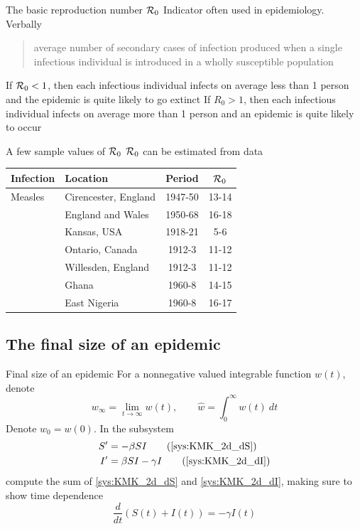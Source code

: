 \documentclass[aspectratio=43]{beamer}
\begin{document}
\begin{frame}{The basic reproduction number $\mathcal{R}_0$}
\bbullet Indicator often used in epidemiology. Verbally
\begin{quote}
  average number of secondary cases of infection produced when a single infectious individual is introduced in a wholly susceptible population
\end{quote}
\vfill
\bbullet If $\mathcal{R}_0<1$, then each infectious individual infects on average less than 1 person and the epidemic is quite likely to go extinct 
\vfill
\bbullet If $R_0>1$, then each infectious individual infects on average more than 1 person and an epidemic is quite likely to occur
\end{frame}

\begin{frame}{A few sample values of $\mathcal{R}_0$}
  $\mathcal{R}_0$ can be estimated from data
  \vfill
  \begin{center}
  \begin{tabular}{llcc}
  \hline 
  Infection & Location & Period & $\mathcal{R}_0$ \\
  \hline
  Measles & Cirencester, England & 1947-50 & 13-14 \\
  & England and Wales & 1950-68 & 16-18 \\
  & Kansas, USA & 1918-21 & 5-6 \\
  & Ontario, Canada & 1912-3 & 11-12 \\
  & Willesden, England & 1912-3 & 11-12 \\
  & Ghana & 1960-8 & 14-15 \\
  & East Nigeria & 1960-8 & 16-17 \\
  \end{tabular}
  \end{center}
\end{frame}
    

\subsection{The final size of an epidemic}

\begin{frame}{Final size of an epidemic}
  For a nonnegative valued integrable function $w(t)$, denote
  $$
  w_\infty = \lim_{t\to\infty}w(t),\qquad\hat w = \int_0^\infty w(t)\ dt
  $$
  Denote $w_0=w(0)$. In the subsystem
  \begin{align}
  S' &= -\beta SI \tag{\ref{sys:KMK_2d_dS}} \\
  I' &= \beta SI-\gamma I \tag{\ref{sys:KMK_2d_dI}} 
  \end{align}
  compute the sum of \eqref{sys:KMK_2d_dS} and \eqref{sys:KMK_2d_dI}, making sure to show time dependence $$
  \frac{d}{dt}(S(t)+I(t))=-\gamma I(t)
  $$
\end{frame}
\end{document}
